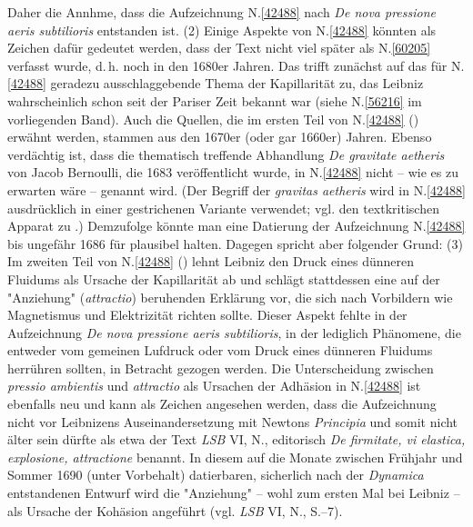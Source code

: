 Daher die Annhme, dass die Aufzeichnung N.\;\ref{42488} nach \textit{De nova pressione aeris subtilioris} entstanden ist.
\pend%
\pstart%
(2)
Einige Aspekte von N.\;\ref{42488} könnten als Zeichen dafür gedeutet werden, dass der Text nicht viel später als N.\;\ref{60205} verfasst wurde, d.\,h. noch in den 1680er Jahren.
Das trifft zunächst auf das für N.\;\ref{42488} geradezu ausschlaggebende Thema der Kapillarität zu, das Leibniz wahrscheinlich schon seit der Pariser Zeit bekannt war (siehe N.\;\ref{56216} im vorliegenden Band).
Auch die Quellen, die im ersten Teil von N.\;\ref{42488} () erwähnt werden, stammen aus den 1670er (oder gar 1660er) Jahren.
Ebenso verdächtig ist, dass die thematisch treffende Abhandlung \textit{De gravitate aetheris}\cite{01403} von Jacob Bernoulli, die 1683 veröffentlicht wurde, in N.\;\ref{42488} nicht -- wie es zu erwarten wäre -- genannt wird.
(Der Begriff der \textit{gravitas aetheris} wird in N.\;\ref{42488} ausdrücklich in einer gestrichenen Variante verwendet; vgl. den textkritischen Apparat zu .)
Demzufolge könnte man eine Datierung der Aufzeichnung N.\;\ref{42488} bis ungefähr 1686 für plausibel halten.
Dagegen spricht aber folgender Grund:
\pend%
\pstart%
(3)
Im zweiten Teil von N.\;\ref{42488} () lehnt Leibniz den Druck eines dünneren Fluidums als Ursache der Kapillarität ab und schlägt stattdessen eine auf der "Anziehung" (\textit{attractio}) beruhenden Erklärung vor, die sich nach Vorbildern wie Magnetismus und Elektrizität richten sollte.
Dieser Aspekt fehlte in der Aufzeichnung \textit{De nova pressione aeris subtilioris}, in der lediglich Phänomene, die entweder vom gemeinen Lufdruck oder vom Druck eines dünneren Fluidums herrühren sollten, in Betracht gezogen werden.
Die Unterscheidung zwischen \textit{pressio ambientis} und \textit{attractio} als Ursachen der Adhäsion in N.\;\ref{42488} ist ebenfalls neu und kann als Zeichen angesehen werden, dass die Aufzeichnung nicht vor Leibnizens Auseinandersetzung mit Newtons \textit{Principia}\cite{00535} %
und somit nicht älter sein dürfte als etwa der Text \textit{LSB} VI, N.,\cite{02616} editorisch \textit{De firmitate, vi elastica, explosione, attractione} benannt.
In diesem auf die Monate zwischen Frühjahr und Sommer 1690 (unter Vorbehalt) datierbaren, sicherlich nach der \textit{Dynamica}\cite{01354} entstandenen Entwurf wird die "Anziehung" -- wohl zum ersten Mal bei Leibniz -- als Ursache der Kohäsion angeführt (vgl. \textit{LSB} VI, N., S.--7).\cite{02616}
